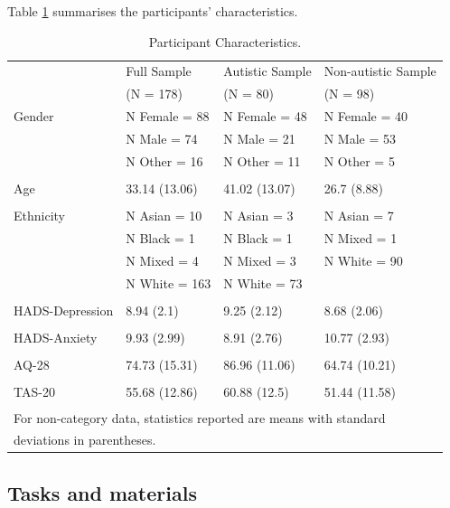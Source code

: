 \documentclass[
]{article}
\begin{document}
Table \ref{tab:table1} summarises the participants' characteristics.

\begin{table}[H]

\caption{\label{tab:table1}Participant Characteristics.}
\centering
\begin{tabular}[t]{llll}
\toprule
 & Full Sample & Autistic Sample & Non-autistic Sample\\
 & (N = 178) & (N = 80) & (N = 98)\\
\midrule
Gender & N Female = 88 & N Female = 48 & N Female = 40\\
 & N Male = 74 & N Male = 21 & N Male = 53\\
 & N Other = 16 & N Other = 11 & N Other = 5\\
\addlinespace
 &  &  \vphantom{5} & \\
Age & 33.14 (13.06) & 41.02 (13.07) & 26.7 (8.88)\\
 &  &  \vphantom{4} & \\
Ethnicity & N Asian = 10 & N Asian = 3 & N Asian = 7\\
 & N Black = 1 & N Black = 1 & N Mixed = 1\\
\addlinespace
 & N Mixed = 4 & N Mixed = 3 & N White = 90\\
 & N White = 163 & N White = 73 & \\
 &  &  \vphantom{3} & \\
HADS-Depression & 8.94 (2.1) & 9.25 (2.12) & 8.68 (2.06)\\
 &  &  \vphantom{2} & \\
\addlinespace
HADS-Anxiety & 9.93 (2.99) & 8.91 (2.76) & 10.77 (2.93)\\
 &  &  \vphantom{1} & \\
AQ-28 & 74.73 (15.31) & 86.96 (11.06) & 64.74 (10.21)\\
 &  &  & \\
TAS-20 & 55.68 (12.86) & 60.88 (12.5) & 51.44 (11.58)\\
\bottomrule
\multicolumn{4}{l}{\textsuperscript{} For non-category data, statistics reported are means with standard}\\
\multicolumn{4}{l}{deviations in parentheses.}\\
\end{tabular}
\end{table}

\hypertarget{tasks-and-materials}{%
\subsection*{Tasks and materials}\label{tasks-and-materials}}
\end{document}
